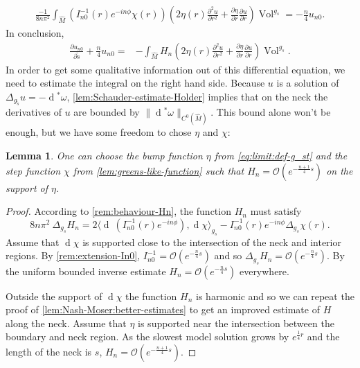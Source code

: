 \documentclass[preprint,12pt]{elsarticle}
\numberwithin{table}{section}
\newtheorem{lemma}{Lemma}[section]
\newcommand{\del}{\partial}
\newcommand{\Vol}{\operatorname{Vol}}
\renewcommand{\d}{\operatorname{d}\!}
\renewcommand{\O}{\mathcal{O}}
\begin{document}
\begin{align}
	\frac{-1}{8 n \pi^2} \int_{\hat M} \left(I_{n0}^{-1}(r) e^{- i n \phi} \chi(r) \right) \left(
		2 \eta (r)
		\frac{\del^2 u}{\del r^2}
		+\frac{\del \eta}{\del r} 
		 \frac{\del u}{\del r}
	\right) \Vol^{g_s} = - \frac{n}{4} u_{n0}.
\end{align}
In conclusion,
\begin{align}
	\label{eq:diff-equation-for-un0}
	\frac{\del u_{n0}}{\del \tilde s} + \frac{n}{4} u_{n0}
	=& - \int_{\hat M} H_n \left(
		2 \eta (r)
		\frac{\del^2 u}{\del r^2}
		+\frac{\del \eta}{\del r} 
		 \frac{\del u}{\del r}
	\right) \Vol^{g_s}.
\end{align}
In order to get some qualitative information out of this differential equation, we need to estimate the integral on the right hand side. Because $u$ is a solution of $\Delta_{g_{\tilde s}} u= - \d^* \omega$, \cref{lem:Schauder-estimate-Holder} 
implies that on the neck the derivatives of $u$ are bounded by $\| \d^* \omega \|_{C^0(\hat M)}$. This bound alone won't be enough, but we have some freedom to chose $\eta$ and $\chi$:

\begin{lemma}
	\label{eq:scaling-along-neck:decay-rate-H_n}
	One can choose the bump function $\eta$ from \cref{eq:limit:def-g_st} and the step function $\chi$ from \cref{lem:greens-like-function} such that 
	$H_n = \O(e^{- \frac{n+1}{4} s})$ on the support of $\eta$.
\end{lemma}
\begin{proof}
	According to \cref{rem:behaviour-Hn}, the function $H_n$ must satisfy
	$$
	8 n \pi^2 \: \Delta_{g_s} H_n 
	= 2\langle \d\:(I_{n0}^{-1}(r) e^{- i n \phi}),   \d \chi \rangle_{g_s}
	- I_{n0}^{-1}(r) e^{- i n \phi} \Delta_{g_s}
		\chi(r).
	$$
	Assume that $\d\chi $ is supported close to the intersection of the neck and interior regions. By \cref{rem:extension-In0}, $I_{n0}^{-1} = \O(e^{-\frac{n}{4}s})$ and so $\Delta_{g_s} H_n = \O(e^{-\frac{n}{4}s})$. By the uniform bounded inverse estimate $H_n = \O(e^{-\frac{n}{4}s})$ everywhere.
	
	Outside the support of $\d \chi$ the function $H_n$ is harmonic and so we can repeat the proof of \cref{lem:Nash-Moser:better-estimates} to get an improved estimate of $H$ along the neck. Assume that $\eta$ is supported near the intersection between the boundary and neck region. As the slowest model solution grows by $e^{\frac{1}{4}r}$ and the length of the neck is $s$,
	$H_n = \O(e^{-\frac{n+1}{4}s})$.
\end{proof}
\end{document}
